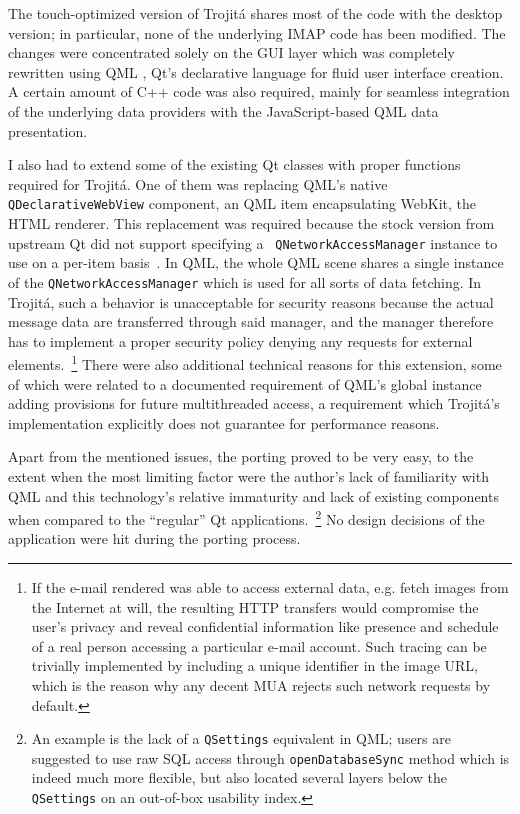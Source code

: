 \documentclass[trojita]{subfiles}
\begin{document}
The touch-optimized version of Trojitá shares most of the code with the desktop version; in particular, none of the
underlying IMAP code has been modified.  The changes were concentrated solely on the GUI layer which was completely
rewritten using QML \cite{qml}, Qt's declarative language for fluid user interface creation.  A certain amount of C++
code was also required, mainly for seamless integration of the underlying data providers with the JavaScript-based QML
data presentation.

I also had to extend some of the existing Qt classes with proper functions required for Trojitá.  One of them was
replacing QML's native {\tt QDeclarativeWebView} component, an QML item encapsulating WebKit, the HTML renderer.  This
replacement was required because the stock version from upstream Qt did not support specifying a {\tt
QNetworkAccessManager} instance to use on a per-item basis~\cite{jkt-qdeclarativewebview}.  In QML, the whole QML scene
shares a single instance of the {\tt QNetworkAccessManager} which is used for all sorts of data fetching.  In Trojitá,
such a behavior is unacceptable for security reasons because the actual message data are transferred through said
manager, and the manager therefore has to implement a proper security policy denying any requests for external
elements.~\footnote{If the e-mail rendered was able to access external data, e.g. fetch images from the Internet at
will, the resulting HTTP transfers would compromise the user's privacy and reveal confidential information like presence
and schedule of a real person accessing a particular e-mail account.  Such tracing can be trivially implemented by
including a unique identifier in the image URL, which is the reason why any decent MUA rejects such network requests by
default.}  There were also additional technical reasons for this extension, some of which were related to a documented
requirement of QML's global instance adding provisions for future multithreaded access, a requirement which Trojitá's
implementation explicitly does not guarantee for performance reasons.

Apart from the mentioned issues, the porting proved to be very easy, to the extent when the most limiting factor were
the author's lack of familiarity with QML and this technology's relative immaturity and lack of existing components when
compared to the ``regular'' Qt applications.~\footnote{An example is the lack of a {\tt QSettings} equivalent in QML;
users are suggested to use raw SQL access through {\tt openDatabaseSync} method which is indeed much more flexible, but
also located several layers below the {\tt QSettings} on an out-of-box usability index.}  No design decisions of the
application were hit during the porting process.
\end{document}
